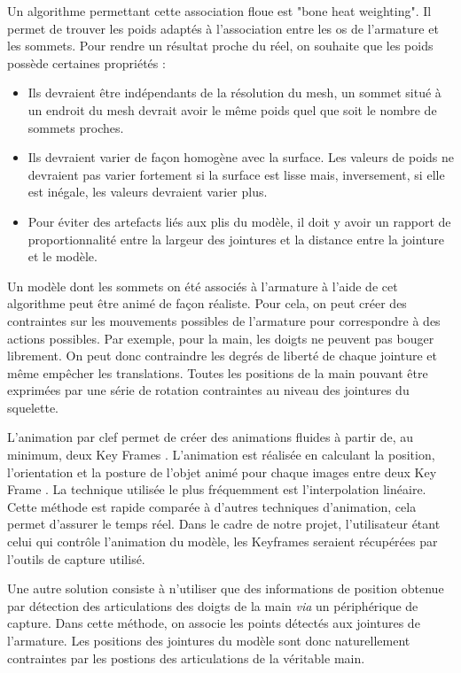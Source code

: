 Un algorithme permettant cette association floue est "bone heat weighting". \cite{baran2007automatic}
Il permet de trouver les poids adaptés à l'association entre les os de l'armature et les sommets. Pour rendre un résultat proche du réel, on souhaite que les poids possède certaines propriétés : \\
\begin{itemize}
	\item Ils devraient être indépendants de la résolution du mesh, un sommet situé à un endroit du mesh devrait avoir le même poids quel
	que soit le nombre de sommets proches.
	\item Ils devraient varier de façon homogène avec la surface. Les valeurs de poids ne devraient pas varier fortement si la surface est lisse mais, inversement, si elle est inégale, les valeurs devraient varier plus.
	\item Pour éviter des artefacts liés aux plis du modèle, il doit y avoir un rapport de proportionnalité entre la largeur des jointures 
	et la distance entre la jointure et le modèle. 
\end{itemize}

Un modèle dont les sommets on été associés à l'armature à l'aide de cet algorithme peut être \og animé \fg  de façon réaliste.
Pour cela, on peut créer des contraintes sur les mouvements possibles de l'armature pour correspondre à des actions possibles.\newline
Par exemple, pour la main, les doigts ne peuvent pas bouger librement. 
On peut donc contraindre les degrés de liberté de chaque jointure et même empêcher les translations. 
Toutes les positions de la main pouvant être exprimées par une série de rotation contraintes au niveau des jointures du squelette.\newline

L'animation par clef permet de créer des animations fluides à partir de, au minimum, deux \og Key Frames \fg. L'animation est réalisée en calculant la position, l'orientation et la posture de l'objet animé pour chaque images entre deux \og Key Frame \fg. La technique utilisée le plus fréquemment est l'interpolation linéaire. Cette méthode est rapide comparée à d'autres techniques d'animation, cela permet d'assurer le temps réel. Dans le cadre de notre projet, l'utilisateur étant celui qui contrôle l'animation du modèle, les \og Keyframes \fg seraient récupérées par l'outils de capture utilisé.

Une autre solution consiste à n'utiliser que des informations de position obtenue par détection des articulations des doigts de la main \textit{via} un périphérique de capture.
Dans cette méthode, on associe les points détectés aux jointures de l'armature. Les positions des jointures du modèle sont donc naturellement contraintes par les postions des articulations de la véritable main.\newline

